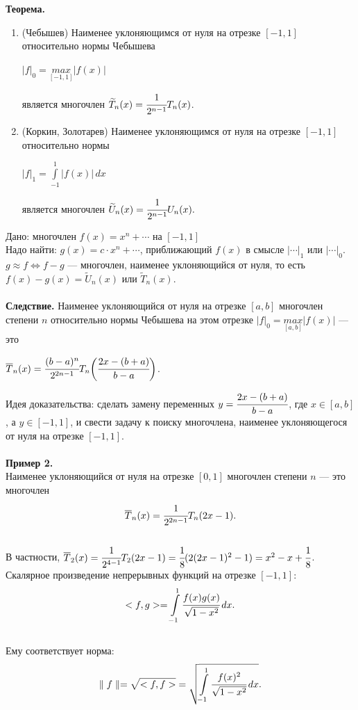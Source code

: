 \documentclass[12pt]{article}
\theoremstyle{definition}
\numberwithin{equation}{section}
\begin{document}
	\textbf{Теорема.}\begin{enumerate}
		\item (Чебышев) Наименее уклоняющимся от нуля на отрезке $[-1, 1]$ относительно нормы Чебышева\begin{center} $|f|_0=\underset{[-1, 1]}{max}|f(x)|$ \end{center} является многочлен $\widetilde T_n(x)=\cfrac{1}{2^{n-1}}T_n(x)$.
		\item (Коркин, Золотарев) Наименее уклоняющимся от нуля на отрезке $[-1, 1]$ относительно нормы \begin{center}$|f|_1=\int\limits_{-1}^1 |f(x)|\,dx$ \end{center} является многочлен $\widetilde U_n(x)=\cfrac{1}{2^{n-1}}U_n(x).$
	\end{enumerate}
	Дано: многочлен $f(x)=x^n+\cdots$ на $[-1, 1]$\\
	Надо найти: $g(x)=c \cdot x^n+\cdots$, приближающий $f(x)$ в смысле $|\cdots|_1$ или $|\cdots|_0$.\\
	$g \approx f \Leftrightarrow f-g$ --- многочлен, наименее уклоняющийся от нуля, то есть $f(x)-g(x) = \widetilde U_n(x)$ или $\widetilde T_n(x)$.\\
	\\
	\textbf{Следствие.}
	Наименее уклоняющийся от нуля на отрезке $[a, b]$ многочлен степени $n$ относительно нормы Чебышева на этом отрезке $|f|_0=\underset{[a, b]}{max}|f(x)|$ --- это \begin{center}$\overline T_n(x) = \cfrac{(b-a)^n}{2^{2n-1}}T_n \bigg(\cfrac{2x-(b+a)}{b-a} \bigg)$.\end{center}
	Идея доказательства: сделать замену переменных $y=\cfrac{2x-(b+a)}{b-a}$, где $x\in [a, b]$, а $y \in [-1, 1]$, и свести задачу к поиску многочлена, наименее уклоняющегося от нуля на отрезке $[-1, 1]$.\\
	\\
	\textbf{Пример 2.}\\
	Наименее уклоняющийся от нуля на отрезке $[0, 1]$ многочлен степени $n$ --- это многочлен $$\overline T_n(x)=\cfrac{1}{2^{2n-1}}T_n(2x-1).$$\\
	В частности, $\overline T_2(x)=\cfrac{1}{2^{4-1}}T_2(2x-1)=\cfrac{1}{8}(2(2x-1)^2-1)=x^2-x+\cfrac{1}{8}$.\\
	\noindent Скалярное произведение непрерывных функций на отрезке $[-1, 1]:$ $$<f, g>=\int\limits_{-1}^1 \cfrac{f(x)g(x)}{\sqrt{1-x^2}}\,dx.$$\\
	Ему соответствует норма: $$\parallel f \parallel=\sqrt{<f,f>}=\sqrt{\int\limits_{-1}^1 \cfrac{f(x)^2}{\sqrt{1-x^2}}\,dx}.$$\\
\end{document}
